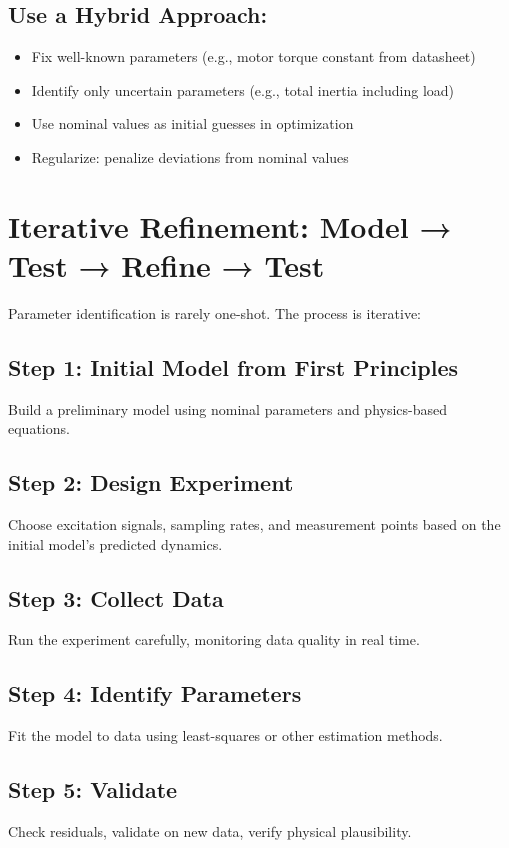 \subsection{Use a Hybrid Approach:}
\begin{itemize}
    \item Fix well-known parameters (e.g., motor torque constant from datasheet)
    \item Identify only uncertain parameters (e.g., total inertia including load)
    \item Use nominal values as initial guesses in optimization
    \item Regularize: penalize deviations from nominal values
\end{itemize}

\section{Iterative Refinement: Model → Test → Refine → Test}

Parameter identification is rarely one-shot. The process is iterative:

\subsection{Step 1: Initial Model from First Principles}
Build a preliminary model using nominal parameters and physics-based equations.

\subsection{Step 2: Design Experiment}
Choose excitation signals, sampling rates, and measurement points based on the initial model's predicted dynamics.

\subsection{Step 3: Collect Data}
Run the experiment carefully, monitoring data quality in real time.

\subsection{Step 4: Identify Parameters}
Fit the model to data using least-squares or other estimation methods.

\subsection{Step 5: Validate}
Check residuals, validate on new data, verify physical plausibility.

